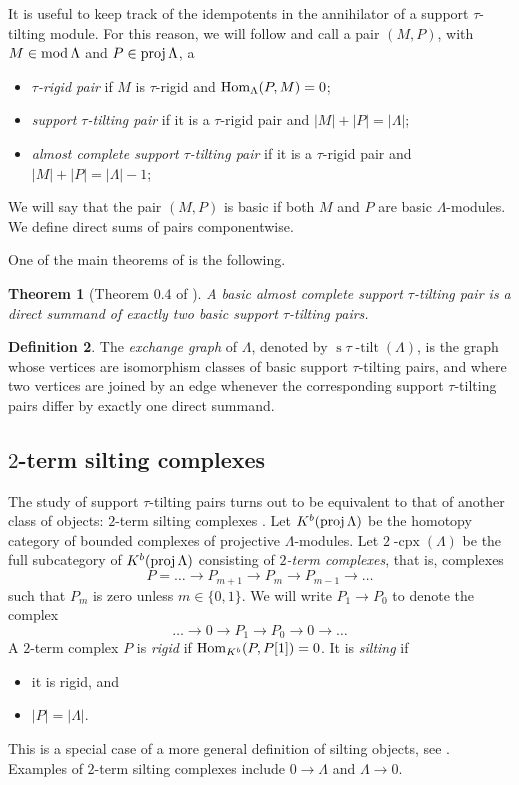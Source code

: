 \documentclass{amsart}
\newtheorem{theorem}{Theorem}%
\theoremstyle{definition}
\newtheorem{definition}[theorem]{Definition}
\newcommand{\darkblue}{\color{darkblue}} %
\newcommand{\defn}[1]{\textsl{\darkblue #1}} %
\newcommand{\stau}{\operatorname{s} \! \tau \! \operatorname{-tilt}}
\newcommand{\cpx}{2 \! \operatorname{-cpx}}
\newcommand{\MOD}{\mbox{{\rm mod \!}}}
\newcommand{\proj}{\operatorname{{\rm proj }}}
\newcommand{\Hom}[1]{\operatorname{{\rm Hom}}_{#1}}
\begin{document}
It is useful to keep track of the idempotents in the annihilator of a support $\tau$-tilting module.
For this reason, we will follow \cite[Definition 0.3]{AIR} and call a pair $(M,P)$, with $M\in \MOD \Lambda$ and $P\in \proj \Lambda$, a
\begin{itemize}
 \item \defn{$\tau$-rigid pair} if $M$ is $\tau$-rigid and $\Hom{\Lambda}(P,M) = 0$;
 \item \defn{support $\tau$-tilting pair} if it is a $\tau$-rigid pair and $|M| + |P| = |\Lambda|$;
 \item \defn{almost complete support $\tau$-tilting pair} if it is a $\tau$-rigid pair and $|M| + |P| = |\Lambda|-1$;
\end{itemize}
We will say that the pair $(M,P)$ is basic if both $M$ and $P$ are basic $\Lambda$-modules.  
We define direct sums of pairs componentwise.

One of the main theorems of \cite{AIR} is the following.

\begin{theorem}[Theorem 0.4 of \cite{AIR}]
 A basic almost complete support $\tau$-tilting pair is a direct summand of exactly two basic support $\tau$-tilting pairs.
\end{theorem}

\begin{definition}
 The \defn{exchange graph} of $\Lambda$, denoted by $\stau(\Lambda)$, is the graph whose vertices are isomorphism classes of basic support
 $\tau$-tilting pairs, and where two vertices are joined by an edge whenever the corresponding support $\tau$-tilting pairs differ
 by exactly one direct summand.
\end{definition}


\subsection{$2$-term silting complexes}
The study of support $\tau$-tilting pairs turns out to be equivalent to that of another class of objects: $2$-term silting complexes \cite[Section 3]{AIR}.
Let $K^b(\proj \Lambda)$ be the homotopy category of bounded complexes of projective $\Lambda$-modules. 
Let $\cpx(\Lambda)$ be the full subcategory of $K^b(\proj \Lambda)$ consisting of \defn{$2$-term complexes}, that is, complexes
\[
 P = \ldots \to P_{m+1} \to P_m \to P_{m-1} \to \ldots
\]
such that $P_m$ is zero unless $m\in \{0,1\}$.  
We will write $P_1\to P_0$ to denote the complex
\[
 \ldots \to 0 \to P_1 \to P_0 \to 0 \to \ldots
\]
A $2$-term complex $P$ is \defn{rigid} if $\Hom{K^b}(P, P[1]) = 0$.  It is \defn{silting} if
\begin{itemize}
 \item it is rigid, and 
 \item $|P| = |\Lambda|$.
\end{itemize}
This is a special case of a more general definition of silting objects, see \cite{}.
Examples of $2$-term silting complexes include $0\to \Lambda$ and $\Lambda \to 0$.
\end{document}
